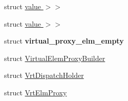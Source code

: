 \begin{DoxyCompactItemize}
\item 
struct \hyperlink{structvt_1_1vrt_1_1collection_1_1_default_map_3_01_collection_t_00_01typename_01std_1_1enable__i0c13cd14d7af17b34311bb8ce93d9804}{value $>$$>$}
\item 
struct \hyperlink{structvt_1_1vrt_1_1collection_1_1_default_map_3_01_collection_t_00_01typename_01std_1_1enable__id31d055881d6867942086ee5834ad7b4}{value $>$$>$}
\item 
struct {\bfseries virtual\+\_\+proxy\+\_\+elm\+\_\+empty}
\item 
struct \hyperlink{structvt_1_1vrt_1_1collection_1_1_virtual_elem_proxy_builder}{Virtual\+Elem\+Proxy\+Builder}
\item 
struct \hyperlink{structvt_1_1vrt_1_1collection_1_1_vrt_dispatch_holder}{Vrt\+Dispatch\+Holder}
\item 
struct \hyperlink{structvt_1_1vrt_1_1collection_1_1_vrt_elm_proxy}{Vrt\+Elm\+Proxy}
\end{DoxyCompactItemize}
